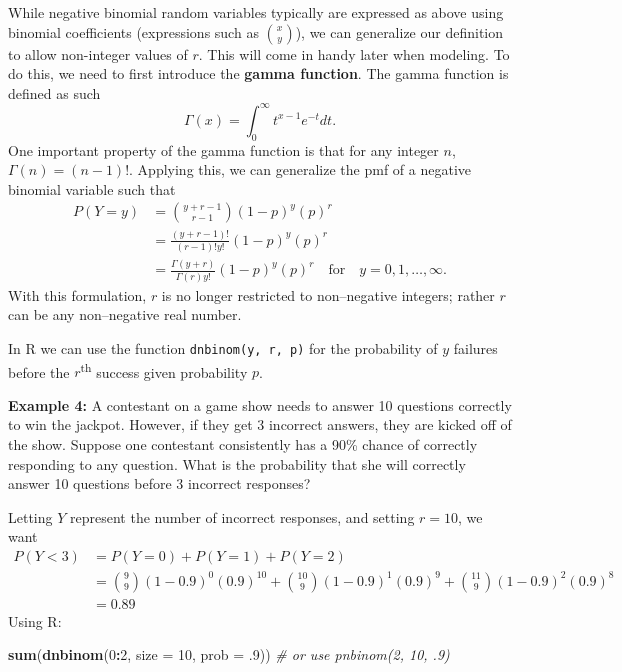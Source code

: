 \documentclass[
]{krantz}
\newenvironment{Shaded}{\begin{snugshade}}{\end{snugshade}}
\newcommand{\CommentTok}[1]{\textcolor[rgb]{0.37,0.37,0.37}{\textit{#1}}}
\newcommand{\DataTypeTok}[1]{\textcolor[rgb]{0.27,0.27,0.27}{#1}}
\newcommand{\DecValTok}[1]{\textcolor[rgb]{0.06,0.06,0.06}{#1}}
\newcommand{\FloatTok}[1]{\textcolor[rgb]{0.06,0.06,0.06}{#1}}
\newcommand{\KeywordTok}[1]{\textcolor[rgb]{0.27,0.27,0.27}{\textbf{#1}}}
\newcommand{\NormalTok}[1]{#1}
\newcommand{\OperatorTok}[1]{\textcolor[rgb]{0.43,0.43,0.43}{\textbf{#1}}}
\begin{document}
While negative binomial random variables typically are expressed as above using binomial coefficients (expressions such as \(\binom{x}{y}\)), we can generalize our definition to allow non-integer values of \(r\). This will come in handy later when modeling. To do this, we need to first introduce the \textbf{gamma function}. The gamma function is defined as such
\begin{equation}
\Gamma(x)  = \int_0^\infty t^{x-1} e^{-t}dt.
\label{eq:gammaFun}
\end{equation}
One important property of the gamma function is that for any integer \(n\), \(\Gamma(n) = (n-1)!\). Applying this, we can generalize the pmf of a negative binomial variable such that
\begin{align*}
 P(Y=y) &= \binom{y + r - 1}{r-1}           (1-p)^{y}(p)^r \\
        &= \frac{(y+r-1)!}{(r-1)!y!}         (1-p)^{y}(p)^r \\
        &= \frac{\Gamma(y+r)}{\Gamma(r) y!}  (1-p)^{y}(p)^r \quad \textrm{for} \quad y = 0, 1, \ldots, \infty.
\end{align*}
With this formulation, \(r\) is no longer restricted to non--negative integers; rather \(r\) can be any non--negative real number.

In R we can use the function \texttt{dnbinom(y,\ r,\ p)} for the probability of \(y\) failures before the \(r\)\textsuperscript{th} success given probability \(p\).

\textbf{Example 4:} A contestant on a game show needs to answer 10 questions correctly to win the jackpot. However, if they get 3 incorrect answers, they are kicked off of the show. Suppose one contestant consistently has a 90\% chance of correctly responding to any question. What is the probability that she will correctly answer 10 questions before 3 incorrect responses?

Letting \(Y\) represent the number of incorrect responses, and setting \(r = 10\), we want
\begin{align*}
 P(Y < 3) &= P(Y=0) + P(Y=1) + P(Y=2) \\
          &= \binom{9}{9}(1-0.9)^0 (0.9)^{10} + \binom{10}{9}(1-0.9)^1 (0.9)^{9} + \binom{11}{9}(1-0.9)^2 (0.9)^{8} \\
          &= 0.89
\end{align*}
Using R:

\begin{Shaded}
\begin{Highlighting}[]
\KeywordTok{sum}\NormalTok{(}\KeywordTok{dnbinom}\NormalTok{(}\DecValTok{0}\OperatorTok{:}\DecValTok{2}\NormalTok{, }\DataTypeTok{size =} \DecValTok{10}\NormalTok{, }\DataTypeTok{prob =} \FloatTok{.9}\NormalTok{))  }\CommentTok{# or use pnbinom(2, 10, .9)}
\end{Highlighting}
\end{Shaded}
\end{document}
